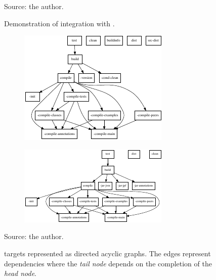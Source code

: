 \documentclass{article}
\begin{document}
\begin{figure}[h!]
    \centering
    \begin{subfigure}[b]{0.4\textwidth}
        
    \end{subfigure}
    \hfill
    \begin{subfigure}[b]{0.4\textwidth}
        
    \end{subfigure}
    \hfill
    \begin{subfigure}[b]{0.4\textwidth}
        
    \end{subfigure}
    \caption{Demonstration of \ant{} integration with
    \gradle{}.\label{fig:gradle-ant-support}}
    {\scriptsize Source: the author.}
\end{figure}


\clearpage

\begin{figure}[t!]
    \centering
    \begin{subfigure}[b]{\textwidth}
        \centering
        \includegraphics[scale=2.45]{figs/jpf-tasks.pdf}%
        \caption{\jpfcore{}\label{fig:tasks:jpf}}
    \end{subfigure}
    \begin{subfigure}[b]{\textwidth}
        \centering
        \vspace{1.1cm}
        \includegraphics[scale=2.9]{figs/symbc-tasks.pdf}%
        \caption{\jpfsymbc{}\label{fig:tasks:symbc}}
    \end{subfigure}
    \vspace{5mm}
    \caption{\ant{} targets represented as directed acyclic graphs. The edges
    represent dependencies where the \emph{tail node} depends on the completion
    of the \emph{head node}.\label{fig:tasks}}
    {\scriptsize Source: the author.}
\end{figure}
\end{document}
